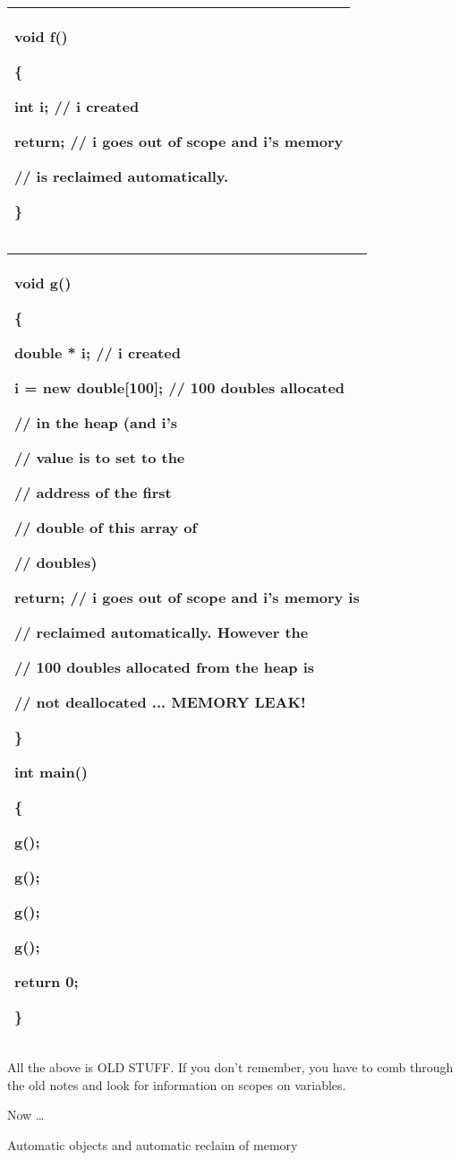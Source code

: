 \documentclass[
]{article}
\begin{document}
\begin{longtable}[]{@{}l@{}}
\toprule
\endhead
\begin{minipage}[t]{0.97\columnwidth}\raggedright
void f()

\{

int i; // i created

return; // i goes out of scope and i's memory

// is reclaimed automatically.

\}\strut
\end{minipage}\tabularnewline
\bottomrule
\end{longtable}

\begin{longtable}[]{@{}l@{}}
\toprule
\endhead
\begin{minipage}[t]{0.97\columnwidth}\raggedright
void g()

\{

double * i; // i created

i = new double{[}100{]}; // 100 doubles allocated

// in the heap (and i's

// value is to set to the

// address of the first

// double of this array of

// doubles)

return; // i goes out of scope and i's memory is

// reclaimed automatically. However the

// 100 doubles allocated from the heap is

// not deallocated ... MEMORY LEAK!

\}

int main()

\{

g();

g();

g();

g();

return 0;

\}\strut
\end{minipage}\tabularnewline
\bottomrule
\end{longtable}

All the above is OLD STUFF. If you don't remember, you have to comb
through the old notes and look for information on scopes on variables.

Now \ldots{}

Automatic objects and automatic reclaim of memory
\end{document}
